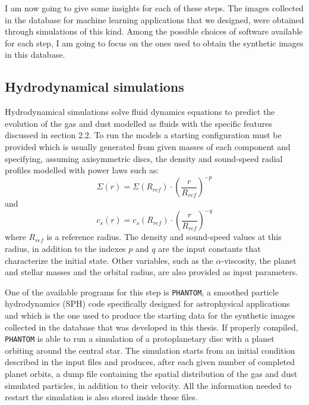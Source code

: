 \documentclass[a4paper,10pt]{report}
\begin{document}
I am now going to give some insights for each of these steps. The images collected in the database for machine learning
applications that we designed, were obtained through simulations of this kind. Among the possible choices
of software available for each step, I am going to focus on the ones used to obtain the synthetic images
in this database.

\subsection{Hydrodynamical simulations}

Hydrodynamical simulations solve fluid dynamics equations to predict the evolution of the gas and dust 
modelled as fluids with the specific features discussed in section 2.2.
To run the models a starting configuration must be provided which is usually generated from given masses 
of each component and specifying, assuming axisymmetric discs, the density and sound-speed radial profiles modelled
with power laws such as:
\begin{equation}
    \Sigma(r) = \Sigma(R_{ref})\cdot\left(\frac{r}{R_{ref}}\right)^{-p}
\end{equation}
and
\begin{equation}
    c_s(r) = c_s(R_{ref})\cdot\left(\frac{r}{R_{ref}}\right)^{-q}
\end{equation}
where $R_{ref}$ is a reference radius. The density and sound-speed values at this radius, in addition to the indexes $p$ and $q$
are the input constants that characterize the initial state.
Other variables, such as the $\alpha$-viscosity, the planet and stellar masses and the orbital radius, are also provided as input parameters.

One of the available programs for this step is \lstinline{PHANTOM}, a smoothed particle hydrodynamics (SPH) code 
specifically designed for astrophysical applications and which is the one used to produce
the starting data for the synthetic images collected in the database that was developed in this thesis.
If properly compiled, \lstinline{PHANTOM} is able to run a simulation of a protoplanetary disc with a planet orbiting around the central star. 
The simulation starts from an initial condition described in the input files and produces, after each given number of completed planet orbits, a dump file
containing the spatial distribution of the gas and dust simulated particles, in addition to their velocity. 
All the information needed to restart the simulation is also stored inside these files.
\end{document}

